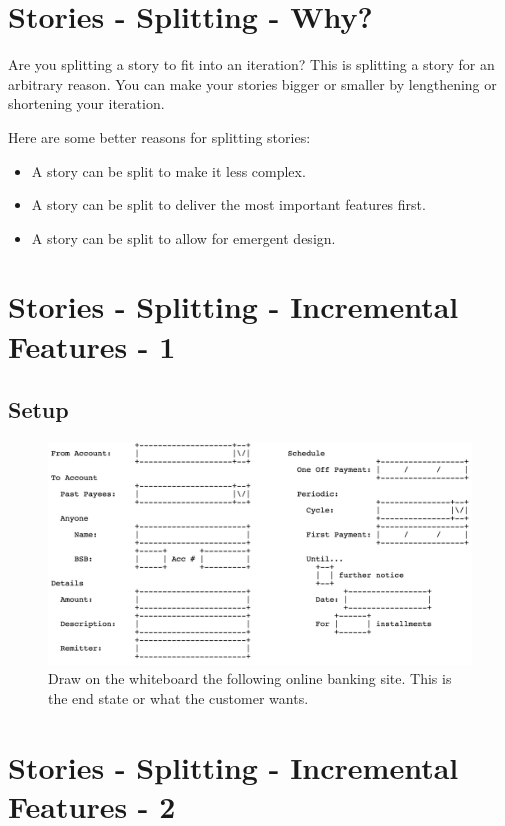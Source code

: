 \section*{Stories - Splitting - Why?}
Are you splitting a story to fit into an iteration? This is splitting a story for an arbitrary reason. You can make your stories bigger or smaller by lengthening or shortening your iteration.

Here are some better reasons for splitting stories:
\begin{itemize}
\item A story can be split to make it less complex.
\item A story can be split to deliver the most important features first.
\item A story can be split to allow for emergent design.
\end{itemize}

\clearpage
\section*{Stories - Splitting - Incremental Features - 1}
\subsection*{Setup}
\begin{figure}[ht]
\centering
\includegraphics[scale=0.3]{stories/banking_wireframe.png}
\caption{Draw on the whiteboard the following online banking site. This is the end state or what the customer wants.}
\end{figure}


\clearpage
\section*{Stories - Splitting - Incremental Features - 2}
